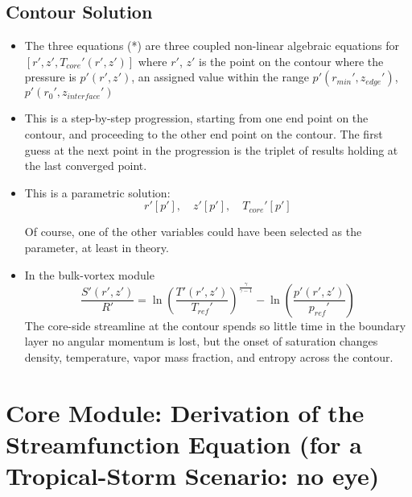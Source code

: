 \documentclass{article}
\begin{document}
\subsection{Contour Solution}

\begin{itemize}
\item The three equations (*) are three coupled non-linear algebraic equations for $[r',z', T_{core}'(r',z')]$ where $r'$, $z'$ is the point on the contour where the pressure is $p'(r',z')$, an assigned value within the range $p'(r_{min}', z_{edge}')$, $p'(r_0', z_{interface}')$

\item This is a step-by-step progression, starting from one end point on the contour, and proceeding  to the other end point on the contour. The first guess at the next point in the progression is the triplet of results holding at the last converged point.

\item This is a parametric solution:
\begin{equation}
	r'[p'], \quad z'[p'], \quad  T_{core}'[p']
\end{equation}

Of course, one of the other variables could have been selected as the parameter, at least in theory.

\item In the bulk-vortex module
\begin{equation}
	\frac{S'(r',z')}{R'} = \ln \left( \frac{T'(r',z')}{T_{ref}'} \right)^\frac{\gamma}{\gamma -1} - \ln \left( \frac{p'(r',z')}{p_{ref}'}\right)
\end{equation}
The core-side streamline at the contour spends so little time in the boundary layer no angular momentum is lost, but the onset of saturation changes density, temperature, vapor mass fraction, and entropy across the contour.
\end{itemize}

\section{Core Module: Derivation of the Streamfunction Equation (for a Tropical-Storm Scenario: no eye)}
\end{document}
